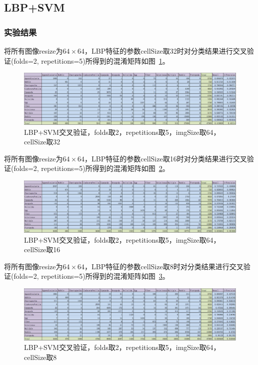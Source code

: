 \documentclass[12pt]{article}
\begin{document}
\subsection{LBP+SVM}

\subsubsection{实验结果}
将所有图像resize为$64 \times 64$，LBP特征的参数cellSize取32时对分类结果进行交叉验证(folds=2, repetitions=5)所得到的混淆矩阵如图~\ref{fig:LBP-SVM-2-folds-5-repetitions-32-64-noNoise}。
\begin{figure}[!ht]
\centering
\includegraphics[width=1.0\linewidth]{LBP-SVM-2-folds-5-repetitions-32-64-noNoise}
\caption{LBP+SVM交叉验证，folds取2，repetitions取5，imgSize取64，cellSize取32}
\label{fig:LBP-SVM-2-folds-5-repetitions-32-64-noNoise}
\end{figure}

将所有图像resize为$64 \times 64$，LBP特征的参数cellSize取16时对分类结果进行交叉验证(folds=2, repetitions=5)所得到的混淆矩阵如图~\ref{fig:LBP-SVM-2-folds-5-repetitions-16-64-noNoise}。
\begin{figure}[!ht]
\centering
\includegraphics[width=1.0\linewidth]{LBP-SVM-2-folds-5-repetitions-16-64-noNoise}
\caption{LBP+SVM交叉验证，folds取2，repetitions取5，imgSize取64，cellSize取16}
\label{fig:LBP-SVM-2-folds-5-repetitions-16-64-noNoise}
\end{figure}

将所有图像resize为$64 \times 64$，LBP特征的参数cellSize取8时对分类结果进行交叉验证(folds=2, repetitions=5)所得到的混淆矩阵如图~\ref{fig:LBP-SVM-2-folds-5-repetitions-8-64-noNoise}。
\begin{figure}[!ht]
\centering
\includegraphics[width=1.0\linewidth]{LBP-SVM-2-folds-5-repetitions-8-64-noNoise}
\caption{LBP+SVM交叉验证，folds取2，repetitions取5，imgSize取64，cellSize取8}
\label{fig:LBP-SVM-2-folds-5-repetitions-8-64-noNoise}
\end{figure}
\end{document}
